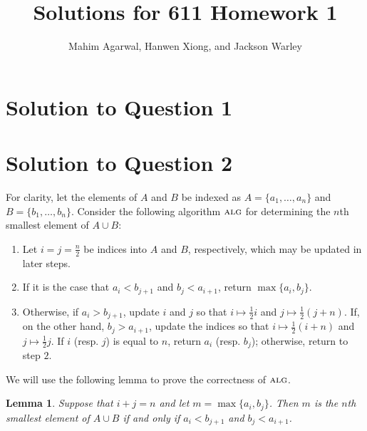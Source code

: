 \documentclass[11pt]{article}
\title{Solutions for 611 Homework 1}
\author{Mahim Agarwal, Hanwen Xiong, and Jackson Warley}
\newcommand{\alg}{\textsc{alg}}
\newtheorem{lemma}[theorem]{Lemma}
\begin{document}
\maketitle

\section{Solution to Question 1}



\section{Solution to Question 2}

For clarity, let the elements of $A$ and $B$ be indexed as $A = \{a_1, \dots, a_n\}$ and $B = \{b_1, \dots, b_n\}$.
Consider the following algorithm $\alg$ for determining the $n$th smallest element of $A \cup B$:
\begin{enumerate}
  \item Let $i = j = \frac{n}{2}$ be indices into $A$ and $B$, respectively, which may be updated in later steps.
  \item If it is the case that $a_i < b_{j+1}$ and $b_j < a_{i+1}$, return $\max \{a_i, b_j\}$.
  \item Otherwise, if $a_i > b_{j+1}$, update $i$ and $j$ so that $i \mapsto \frac{1}{2}i$ and $j \mapsto \frac{1}{2}(j + n)$.
    If, on the other hand, $b_j > a_{i+1}$, update the indices so that $i \mapsto \frac{1}{2}(i + n)$ and $j \mapsto \frac{1}{2}j$.
    If $i$ (resp. $j$) is equal to $n$, return $a_i$ (resp. $b_j$); otherwise, return to step $2$.
\end{enumerate}
We will use the following lemma to prove the correctness of $\alg$.

\begin{lemma}\label{nth-smallest-lemma}
Suppose that $i + j = n$ and let $m = \max \{a_i, b_j\}$. Then $m$ is the $n$th smallest element of $A \cup B$ if and only if $a_i < b_{j+1}$ and $b_j < a_{i+1}$.
\end{lemma}
\end{document}
